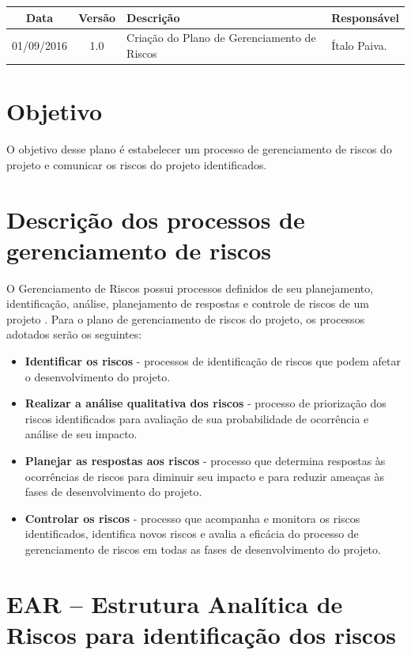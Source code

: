 \begin{apendicesenv}
\begin{table}[h]
\begin{tabular}{|c|c|p{6cm}|p{5cm}|}
Data & Versão & Descrição & Responsável\\
\hline                               
01/09/2016 & 1.0 & Criação do Plano de Gerenciamento de Riscos & Ítalo Paiva.
\\
\hline
\end{tabular}
\end{table}

\section*{Objetivo}
O objetivo desse plano é estabelecer um processo de gerenciamento de riscos do projeto e comunicar os riscos do projeto identificados.

\section*{Descrição dos processos de gerenciamento de riscos}

O Gerenciamento de Riscos possui processos definidos de seu planejamento, identificação, análise, planejamento de respostas e controle de riscos de um projeto \cite{pmbok}.
Para o plano de gerenciamento de riscos do projeto, os processos adotados serão os seguintes:

\begin{itemize}
  \item \textbf{Identificar os riscos} - processos de identificação de riscos que podem afetar o desenvolvimento do projeto.
  \item \textbf{Realizar a análise qualitativa dos riscos} - processo de priorização dos riscos identificados para avaliação de sua probabilidade de ocorrência e análise de seu impacto.
  \item \textbf{Planejar as respostas aos riscos} - processo que determina respostas às ocorrências de riscos para diminuir seu impacto e para reduzir ameaças às fases de desenvolvimento do projeto.
  \item \textbf{Controlar os riscos} - processo que acompanha e monitora os riscos identificados, identifica novos riscos e avalia a eficácia do processo de gerenciamento de riscos em todas as fases de desenvolvimento do projeto.
\end{itemize}

\section*{EAR – Estrutura Analítica de Riscos para identificação dos riscos}
	

\end{apendicesenv}
